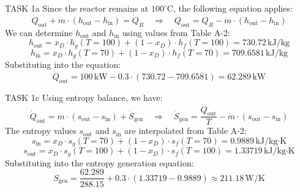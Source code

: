 TASK 1a  
Since the reactor remains at \( 100^\circ\text{C} \), the following equation applies:  
\[
\dot{Q}_{\text{out}} + \dot{m} \cdot (h_{\text{out}} - h_{\text{in}}) = \dot{Q}_R \quad \Rightarrow \quad \dot{Q}_{\text{out}} = \dot{Q}_R - \dot{m} \cdot (h_{\text{out}} - h_{\text{in}})
\]  
We can determine \( h_{\text{out}} \) and \( h_{\text{in}} \) using values from Table A-2:  
\[
h_{\text{out}} = x_D \cdot h_g(T=100) + (1 - x_D) \cdot h_f(T=100) = 730.72 \, \text{kJ/kg}
\]  
\[
h_{\text{in}} = x_D \cdot h_g(T=70) + (1 - x_D) \cdot h_f(T=70) = 709.6581 \, \text{kJ/kg}
\]  
Substituting into the equation:  
\[
\dot{Q}_{\text{out}} = 100 \, \text{kW} - 0.3 \cdot (730.72 - 709.6581) = 62.289 \, \text{kW}
\]  

TASK 1c  
Using entropy balance, we have:  
\[
\dot{Q}_{\text{out}} = \dot{m} \cdot (s_{\text{out}} - s_{\text{in}}) + \dot{S}_{\text{gen}} \quad \Rightarrow \quad \dot{S}_{\text{gen}} = \frac{\dot{Q}_{\text{out}}}{T} - \dot{m} \cdot (s_{\text{out}} - s_{\text{in}})
\]  
The entropy values \( s_{\text{out}} \) and \( s_{\text{in}} \) are interpolated from Table A-2:  
\[
s_{\text{in}} = x_D \cdot s_g(T=70) + (1 - x_D) \cdot s_f(T=70) = 0.9889 \, \text{kJ/kg·K}
\]  
\[
s_{\text{out}} = x_D \cdot s_g(T=100) + (1 - x_D) \cdot s_f(T=100) = 1.33719 \, \text{kJ/kg·K}
\]  
Substituting into the entropy generation equation:  
\[
\dot{S}_{\text{gen}} = \frac{62.289}{288.15} + 0.3 \cdot (1.33719 - 0.9889) \approx 211.18 \, \text{W/K}
\]
